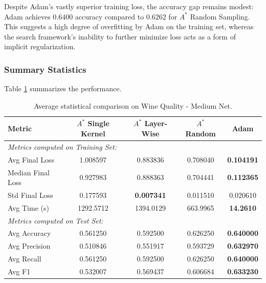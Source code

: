 Despite Adam's vastly superior training loss, the accuracy gap remains modest: Adam achieves $0.6400$ accuracy compared to $0.6262$ for $A^*$ Random Sampling. This suggests a high degree of overfitting by Adam on the training set, whereas the search framework’s inability to further minimize loss acts as a form of implicit regularization.

\subsubsection{Summary Statistics}

Table \ref{tab:medium_net_wine} summarizes the performance.

\begin{table}[H]
\centering
\scriptsize
\begin{tabular}{|l|c|c|c|c|}
\hline
\textbf{Metric}   & \textbf{$A^*$ Single Kernel} & \textbf{$A^*$ Layer-Wise} & \textbf{$A^*$ Random} & \textbf{Adam} \\ \hline
\multicolumn{5}{|l|}{\textit{Metrics computed on Training Set:}} \\ \hline
Avg Final Loss          & 1.008597                     & 0.883836                  & 0.708040              & \textbf{0.104191} \\ 
Median Final Loss       & 0.927983                     & 0.888363                  & 0.704441              & \textbf{0.112365} \\
Std Final Loss          & 0.177593                     & \textbf{0.007341}         & 0.011510              & 0.020610      \\ \hline
Avg Time (s)            & 1292.5712                    & 1394.0129                 & 663.9965              & \textbf{14.2610}  \\ \hline
\multicolumn{5}{|l|}{\textit{Metrics computed on Test Set:}} \\ \hline
Avg Accuracy            & 0.561250                     & 0.592500                  & 0.626250              & \textbf{0.640000} \\ 
Avg Precision           & 0.510846                     & 0.551917                  & 0.593729              & \textbf{0.632970} \\ 
Avg Recall              & 0.561250                     & 0.592500                  & 0.626250              & \textbf{0.640000} \\ 
Avg F1                  & 0.532007                     & 0.569437                  & 0.606684              & \textbf{0.633230} \\ \hline
\end{tabular}
\caption{Average statistical comparison on Wine Quality - Medium Net.}
\label{tab:medium_net_wine}
\end{table}

